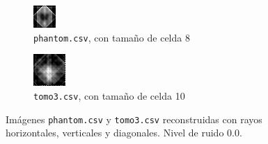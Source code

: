 \documentclass[a4paper]{article}
\begin{document}
\begin{figure}
\centering
\begin{subfigure}{0.4\textwidth}
  \centering
  \includegraphics[width=0.6\linewidth]{rayos/phantom-vhd}
  \caption{\texttt{phantom.csv}, con tamaño de celda 8}
\end{subfigure}%
\begin{subfigure}{0.4\textwidth}
  \centering
  \includegraphics[width=0.6\linewidth]{rayos/tomo3-vhd}
  \caption{\texttt{tomo3.csv}, con tamaño de celda 10}
\end{subfigure}
\caption{Imágenes \texttt{phantom.csv} y \texttt{tomo3.csv} reconstruidas con rayos horizontales, verticales y diagonales. Nivel de ruido 0.0.}
\label{fig:muestras_vhd}
\end{figure}

\end{document}
